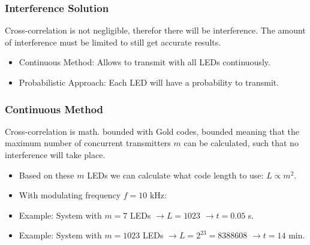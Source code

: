 \documentclass{beamer}
\begin{document}
	\begin{frame}\frametitle{Interference Solution}

		Cross-correlation is not negligible, therefor there will be interference. The amount of interference must be limited to still get accurate results.

		\begin{itemize}

			\item Continuous Method: Allows to transmit with all LEDs continuously.

			\item Probabilistic Approach: Each LED will have a probability to transmit.


		\end{itemize}


	\end{frame}


	\begin{frame}\frametitle{Continuous Method}

		Cross-correlation is math. bounded with Gold codes, bounded meaning that the maximum number of concurrent transmitters $m$ can be calculated, such that no interference will take place.

		\begin{itemize}
			\item Based on these $m$ LEDs we can calculate what code length to use: $L \propto m^2$.
			\item With modulating frequency $f = 10$ kHz:
			\item Example: System with $m = 7$ LEDs $\rightarrow L = 1023$ $\rightarrow t = 0.05$ s.
			\item Example: System with $m = 1023$ LEDs $\rightarrow L = 2^{23} = 8388608$ $\rightarrow t = 14$ min.
		\end{itemize}


	\end{frame}
\end{document}
